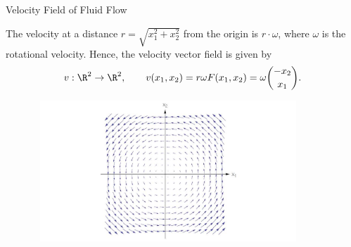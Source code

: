 \documentclass[smaller,hyperref={CJKbookmarks=true}]{beamer}
\begin{document}
\begin{frame}[t]{Velocity Field of Fluid Flow}
\begin{spacing}{1.05}
The velocity at a distance $r=\sqrt{x_1^2+x_2^2}$ from the origin is $r\cdot\omega$, where $\omega$ is the rotational velocity. Hence, the velocity vector field is given by
\begin{equation}\label{3.1.4}
  v:\R^2\to\R^2,\qquad v(x_1,x_2)=
  r\omega F(x_1,x_2)=\omega\binom{-x_2}{x_1}.
\end{equation}
\vspace*{-20pt}
\begin{figure}
  \centering
  \includegraphics[width=0.9\textwidth,height=150pt]{65.jpg}

\end{figure}
\end{spacing}
\end{frame}
\end{document}

